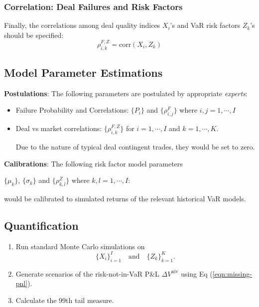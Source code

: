 \documentclass[10pt,a4paper]{article}
\newcommand{\notInVaR}{{\mathrm{niv}}}
\begin{document}
\subsubsection{Correlation: Deal Failures and Risk Factors}

Finally, the correlations among deal quality indices $X_i$'s and VaR risk factors $Z_k$'s should be specified:
\begin{equation}
\rho_{i,k}^{F,Z} = \mathrm{corr}(X_i, Z_k)
\end{equation}



\subsection{Model Parameter Estimations}

{\bf Postulations}: The following parameters are postulated by appropriate {\em experts}:
\begin{itemize}
	\item Failure Probability and Correlations: 	$\{P_i\}$ and $\{\rho^F_{i,j}\}$ where $i, j = 1, \cdots, I$
	\item Deal vs market correlations: $\{ \rho_{i,k}^{F,Z}\}$ for $i = 1, \cdots, I$ and $k = 1, \cdots, K$. 
	
	Due to the nature of typical deal contingent trades, they would be set to zero. 
	
\end{itemize}


{\bf Calibrations}: The following risk factor model parameters 
\begin{center}
	$\{\mu_k\}$, $\{\sigma_k\}$ and $\{\rho_{k,l}^Z\}$ where $k, l = 1, \cdots, I$: 
\end{center}
would be calibrated to simulated returns of the relevant historical VaR models. 

\subsection{Quantification}

\begin{enumerate}
	\item Run standard Monte Carlo simulations on 
	\begin{equation}
	\{X_i\}_{i=1}^{I}\quad\textrm{and}\quad\{Z_k\}_{k=1}^{K}.
	\end{equation}
	\item Generate scenarios of the risk-not-in-VaR P\&L $\Delta V^\notInVaR$ using Eq (\ref{eqn:missing-pnl}).
	\item Calculate the 99th tail measure.
\end{enumerate}
\end{document}
